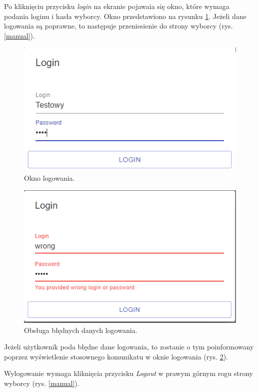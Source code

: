 \documentclass[a4paper,12pt]{book}
\begin{document}
Po kliknięciu przycisku \textit{login} na ekranie pojawaia się okno, które wymaga podania loginu i hasła wyborcy. Okno przedstawiono na rysunku \ref{userlogin}. Jeżeli dane logowania są poprawne, to następuje przeniesienie do strony wyborcy (rys. \ref{manual}).

\begin{figure}[h]
	\centering
	\includegraphics{images/userlogin.png}
	\caption{Okno logowania.}\label{userlogin}
\end {figure}

\begin{figure}[h]
	\centering
	\includegraphics{images/errorlogin.png}
	\caption{Obsługa błędnych danych logowania.}\label{wronglogin}
\end {figure}

Jeżeli użytkownik poda błędne dane logowania, to zostanie o tym poinformowany poprzez wyświetlenie stosownego komunikatu w oknie logowania (rys. \ref{wronglogin}). 

\newpage

Wylogowanie wymaga kliknięcia przycisku \textit{Logout} w prawym górnym rogu strony wyborcy (rys. \ref{manual}).
\end{document}
